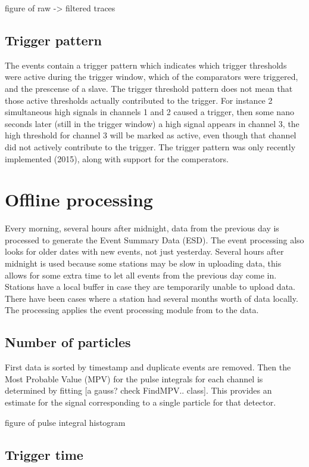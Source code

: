 figure of raw -> filtered traces


\subsection{Trigger pattern}

The \hisparc events contain a trigger pattern which indicates which trigger thresholds were active during the trigger window, which of the comparators were triggered, and the prescense of a slave. The trigger threshold pattern does not mean that those active thresholds actually contributed to the trigger. For instance 2 simultaneous high signals in channels 1 and 2 caused a trigger, then some nano seconds later (still in the trigger window) a high signal appears in channel 3, the high threshold for channel 3 will be marked as active, even though that channel did not actively contribute to the trigger. The trigger pattern was only recently implemented (2015), along with support for the comperators.


\section{Offline processing}

Every morning, several hours after midnight, data from the previous day is processed to generate the Event Summary Data (ESD). The event processing also looks for older dates with new events, not just yesterday. Several hours after midnight is used because some stations may be slow in uploading data, this allows for some extra time to let all events from the previous day come in. Stations have a local buffer in case they are temporarily unable to upload data. There have been cases where a station had several months worth of data locally. The processing applies the event processing module from \sapphire to the data.

\subsection{Number of particles}

First data is sorted by timestamp and duplicate events are removed. Then the Most Probable Value (MPV) for the pulse integrals for each channel is determined by fitting [a gauss? check FindMPV.. class]. This provides an estimate for the signal corresponding to a single particle for that detector.

figure of pulse integral histogram


\subsection{Trigger time}

